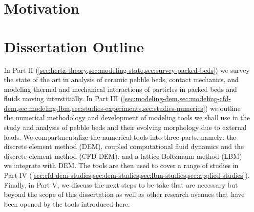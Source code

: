 \chapter{Motivation}\label{sec:motivation}




\chapter{Dissertation Outline}
In Part II (\cref{sec:hertz-theory,sec:modeling-state,sec:survey-packed-beds}) we survey the state of the art in analysis of ceramic pebble beds, contact mechanics, and modeling thermal and mechanical interactions of particles in packed beds and fluids moving interstitially.  In Part III (\cref{sec:modeling-dem,sec:modeling-cfd-dem,sec:modeling-lbm,sec:studies-experiments,sec:studies-numerics}) we outline the numerical methodology and development of modeling tools we shall use in the study and analysis of pebble beds and their evolving morphology due to external loads. We compartmentalize the numerical tools into three parts, namely: the discrete element method (DEM), coupled computational fluid dynamics and the discrete element method (CFD-DEM), and a lattice-Boltzmann method (LBM) we integrate with DEM. The tools are then used to cover a range of studies in Part IV (\cref{sec:cfd-dem-studies,sec:dem-studies,sec:lbm-studies,sec:applied-studies}). Finally, in Part V, we discuss the next steps to be take that are necessary but beyond the scope of this dissertation as well as other research avenues that have been opened by the tools introduced here.
